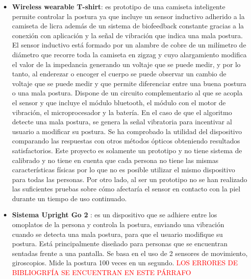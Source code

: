 \begin{itemize}
    \item \textbf{Wireless wearable T-shirt}\cite{wirelessT-shirt}: es prototipo de una camiseta inteligente permite controlar la postura ya que incluye un sensor inductivo adherido a la camiseta de licra además de un sistema de biofeedback constante gracias a la conexión con aplicación y la señal de vibración que indica una mala postura. El sensor inductivo está formado por un alambre de cobre de un milímetro de diámetro que recorre toda la camiseta en zigzag y cuyo alargamiento modifica el valor de la impedancia generando un voltaje que se puede medir, y por lo tanto, al enderezar o encoger el cuerpo se puede observar un cambio de voltaje que se puede medir y que permite diferenciar entre una buena postura o una mala postura. Dispone de un circuito complementario al que se acopla el sensor y que incluye el módulo bluetooth, el módulo con el motor de vibración, el microprocesador y la batería. En el caso de que el algoritmo detecte una mala postura, se genera la señal vibratoria para incentivar al usuario a modificar su postura. Se ha comprobado la utilidad del dispositivo comparando las respuestas con otros métodos ópticos obteniendo resultados satisfactorios. Este proyecto es solamente un prototipo y no tiene sistema de calibrado y no tiene en cuenta que cada persona no tiene las mismas características físicas por lo que no es posible utilizar el mismo dispositivo para todas las personas. Por otro lado, al ser un prototipo no se han realizado las suficientes pruebas sobre cómo afectaría el sensor en contacto con la piel durante un tiempo de uso continuado.

    \item \textbf{Sistema Upright Go 2} \cite{UprightGo1, UprightGo2,UprightGo3,UprightGo4}: es un dispositivo que se adhiere entre los omoplatos de la persona y controla la postura, enviando una vibración cuando se detecta una mala postura, para que el usuario modifique su postura. Está principalmente diseñado para personas que se encuentran sentadas frente a una pantalla. Se basa en el uso de 2 sensores de movimiento, giroscopios. Mide la postura 100 veces en un segundo. \textcolor{red}{LOS ERRORES DE BIBLIOGRFÍA SE ENCUENTRAN EN ESTE PÁRRAFO}
    

\end{itemize}
